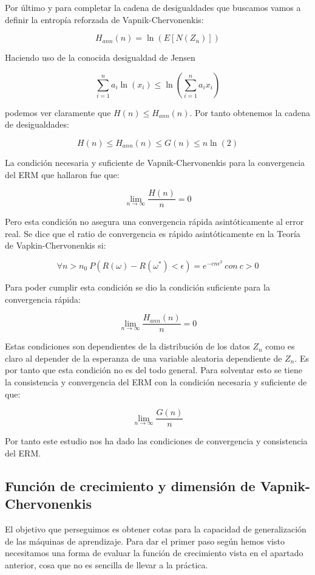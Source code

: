 Por último y para completar la cadena de desigualdades que buscamos vamos a definir la entropía reforzada de Vapnik-Chervonenkis:

$$H_{ann}(n) = \ln (E[N(Z_n)])$$

Haciendo uso de la conocida desigualdad de Jensen

$$\sum_{i=1}^{n}a_i \ln (x_i) \leq \ln (\sum_{i=1}^{n}a_i x_i)$$

podemos ver claramente que $H(n)\leq H_{ann}(n)$. Por tanto obtenemos la cadena de desigualdades:

$$H(n)\leq H_{ann}(n) \leq G(n) \leq n\ln (2)$$

La condición necesaria y suficiente de Vapnik-Chervonenkis para la convergencia del ERM que hallaron fue que:

$$\lim\limits_{n\rightarrow \infty} \frac{H(n)}{n} = 0$$

Pero esta condición no asegura una convergencia rápida asintóticamente al error real. Se dice que el ratio de convergencia es rápido asintóticamente en la Teoría de Vapkin-Chervonenkis si:

$$\forall n>n_0 \ P(R(\omega) - R(\omega^*)<\epsilon) = e^{-cn\epsilon^2} \ con \ c>0$$

Para poder cumplir esta condición se dio la condición suficiente para la convergencia rápida:

$$\lim\limits_{n\rightarrow \infty} \frac{H_{ann}(n)}{n} = 0$$

Estas condiciones son dependientes de la distribución de los datos $Z_n$ como es claro al depender de la esperanza de una variable aleatoria dependiente de $Z_n$. Es por tanto que esta condición no es del todo general. Para solventar esto se tiene la consistencia y convergencia del ERM con la condición necesaria y suficiente de que:

$$\lim\limits_{n\rightarrow \infty}\frac{G(n)}{n}$$

Por tanto este estudio nos ha dado las condiciones de convergencia y consistencia del ERM.

\subsection{Función de crecimiento y dimensión de Vapnik-Chervonenkis}

El objetivo que perseguimos es obtener cotas para la capacidad de generalización de las máquinas de aprendizaje. Para dar el primer paso según hemos visto necesitamos una forma de evaluar la función de crecimiento vista en el apartado anterior, cosa que no es sencilla de llevar a la práctica.

